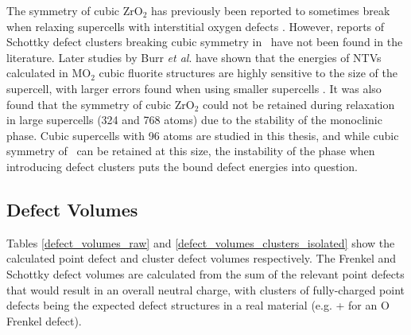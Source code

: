 The symmetry of cubic ZrO$_{2}$ has previously been reported to sometimes break when relaxing supercells with interstitial oxygen defects \cite{samanta2010thermodynamic}. However, reports of Schottky defect clusters breaking cubic symmetry in \zirconia\ have not been found in the literature. Later studies by Burr \emph{et al}. have shown that the energies of NTVs calculated in MO$_{2}$ cubic fluorite structures are highly sensitive to the size of the supercell, with larger errors found when using smaller supercells \cite{burr2017importance}. It was also found that the symmetry of cubic ZrO$_{2}$ could not be retained during relaxation in large supercells (324 and 768 atoms) due to the stability of the monoclinic phase. Cubic supercells with 96 atoms are studied in this thesis, and while cubic symmetry of \zirconia\ can be retained at this size, the instability of the phase when introducing defect clusters puts the bound defect energies into question.


\subsection{Defect Volumes} \label{defect_volumes_r1}

Tables \ref{defect_volumes_raw} and \ref{defect_volumes_clusters_isolated} show the calculated point defect and cluster defect volumes respectively. The Frenkel and Schottky defect volumes are calculated from the sum of the relevant point defects that would result in an overall neutral charge, with clusters of fully-charged point defects being the expected defect structures in a real material (e.g.  +  for an O Frenkel defect).

